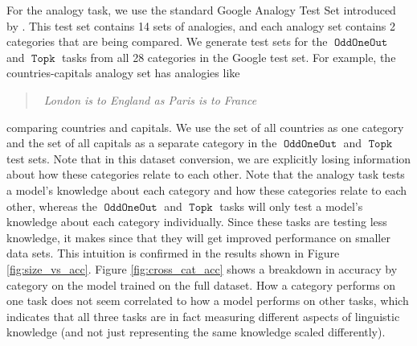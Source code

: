 \documentclass[11pt,a4paper]{article}
\DeclareMathOperator{\OddOneOut}{\texttt{OddOneOut}}
\DeclareMathOperator{\topk}{\texttt{Topk}}
\begin{document}
For the analogy task, we use the standard Google Analogy Test Set introduced by \citep{mikolov2013efficient}.
This test set contains 14 sets of analogies,
and each analogy set contains 2 categories that are being compared.
We generate test sets for the $\OddOneOut$ and $\topk$ tasks from all 28 categories in the Google test set.
For example,
the countries-capitals analogy set has analogies like
\begin{quote}
    ~\!\!\!\!\!\!\emph{London is to England as Paris is to France}
\end{quote}
comparing countries and capitals.
We use the set of all countries as one category and the set of all capitals as a separate category in the $\OddOneOut$ and $\topk$ test sets.
Note that in this dataset conversion, we are explicitly losing information about how these categories relate to each other.
Note that the analogy task tests a model's knowledge about each category and how these categories relate to each other,
whereas the $\OddOneOut$ and $\topk$ tasks will only test a model's knowledge about each category individually.
Since these tasks are testing less knowledge,
it makes since that they will get improved performance on smaller data sets.
This intuition is confirmed in the results shown in Figure \ref{fig:size_vs_acc}.
Figure \ref{fig:cross_cat_acc} shows a breakdown in accuracy by category on the model trained on the full dataset.
How a category performs on one task does not seem correlated to how a model performs on other tasks,
which indicates that all three tasks are in fact measuring different aspects of linguistic knowledge (and not just representing the same knowledge scaled differently).
\end{document}
